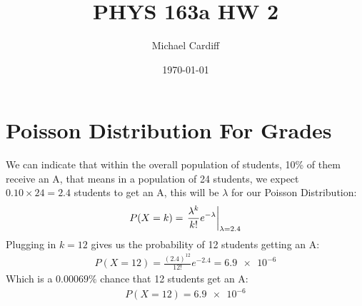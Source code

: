 \documentclass[12pt]{article}
\title{\vspace{-3em}PHYS 163a HW 2}
\author{Michael Cardiff}
\date{\today}
\begin{document}
\maketitle

\section{Poisson Distribution For Grades}
We can indicate that within the overall population of students, 10\% of them receive an A, that means in a population of 24 students, we expect $0.10\times24=2.4$ students to get an A, this will be $\lambda$ for our Poisson Distribution:
\begin{align*}
  P(X=k)=\eval{\frac{\lambda^k}{k!}e^{-\lambda}}_{\lambda=2.4}
\end{align*}
Plugging in $k=12$ gives us the probability of 12 students getting an A:
\begin{align*}
  P(X=12)=\frac{(2.4)^{12}}{12!}e^{-2.4}=\num{6.9e-6}
\end{align*}
Which is a $0.00069\%$ chance that 12 students get an A:
\begin{align}
  \boxed{P(X=12)=\num{6.9e-6}}
\end{align}
\end{document}
